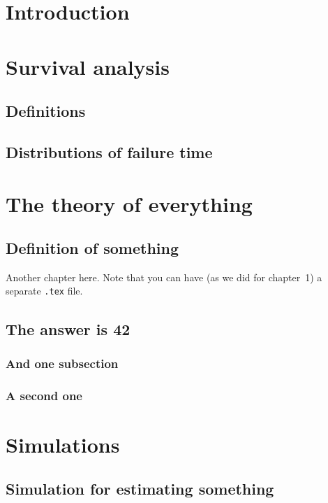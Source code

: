 \documentclass[12pt, a4paper, openany]{book}
\makeatletter
\renewcommand\mainmatter{\clearpage\@mainmattertrue\pagenumbering{arabic}}
\renewcommand\backmatter{\clearpage\@mainmatterfalse}
\makeatother
\begin{document}
\clearpage

\clearpage

\clearpage

\tableofcontents

\mainmatter
\chapter{Introduction}
\setcounter{page}{1}


\chapter{Survival analysis}
\section{Definitions}

\section{Distributions of failure time}


\chapter{The theory of everything}
\section{Definition of something}
Another chapter here. Note that you can have (as we did for chapter~1) a separate \texttt{.tex} file.
\section{The answer is 42}
\subsection{And one subsection}
\subsection{A second one}

\chapter{Simulations}
\section{Simulation for estimating something}


\backmatter


\end{document}
